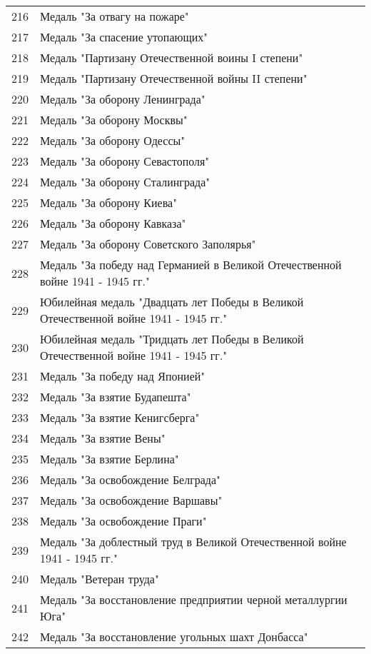 \documentclass[10pt, a4paper, titlepage]{article}
\begin{document}
\begin{center}
\begin{longtable}{rp{}}
        216 & Медаль "За отвагу на пожаре" \\
        217 & Медаль "За спасение утопающих" \\
        218 & Медаль "Партизану Отечественной воины I степени" \\
        219 & Медаль "Партизану Отечественной войны II степени" \\
        220 & Медаль "За оборону Ленинграда" \\
        221 & Медаль "За оборону Москвы" \\
        222 & Медаль "За оборону Одессы" \\
        223 & Медаль "За оборону Севастополя" \\
        224 & Медаль "За оборону Сталинграда" \\
        225 & Медаль "За оборону Киева" \\
        226 & Медаль "За оборону Кавказа" \\
        227 & Медаль "За оборону Советского Заполярья" \\
        228 & Медаль "За победу над Германией в Великой Отечественной войне 1941 - 1945 гг." \\
        229 & Юбилейная медаль "Двадцать лет Победы в Великой Отечественной войне 1941 - 1945 гг." \\
        230 & Юбилейная медаль "Тридцать лет Победы в Великой Отечественной войне 1941 - 1945 гг." \\
        231 & Медаль "За победу над Японией" \\
        232 & Медаль "За взятие Будапешта" \\
        233 & Медаль "За взятие Кенигсберга" \\
        234 & Медаль "За взятие Вены" \\
        235 & Медаль "За взятие Берлина" \\
        236 & Медаль "За освобождение Белграда" \\
        237 & Медаль "За освобождение Варшавы" \\
        238 & Медаль "За освобождение Праги" \\
        239 & Медаль "За доблестный труд в Великой Отечественной войне 1941 - 1945 гг." \\
        240 & Медаль "Ветеран труда" \\
        241 & Медаль "За восстановление предприятии черной металлургии Юга" \\
        242 & Медаль "За восстановление угольных шахт Донбасса" \\

\end{longtable}
\end{center}
\end{document}
